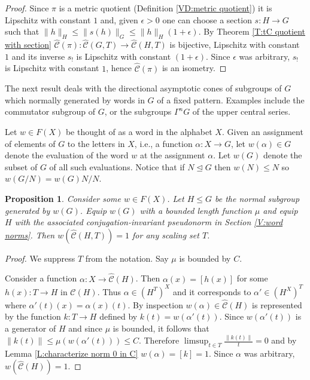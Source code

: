 \documentclass[12pt]{amsart}
\newtheorem{prop}{Proposition}[section]
\theoremstyle{definition}
\def\nsg{\trianglelefteq}
\newcommand{\C}[1]{\mathcal{#1}}
\def\Free{F}
\def\tC{\hat{\mathcal{C}}}
\begin{document}
\begin{proof}
Since $\pi$ is a metric quotient (Definition \ref{VD:metric quotient}) it is Lipschitz with constant $1$ and, given $\epsilon>0$ one can choose a section $s \colon H \to G$ such that $\| h\|_H \leq \|s(h)\|_G \leq \|h\|_H (1+\epsilon)$.
 By Theorem \ref{T:tC quotient with section} $\tC(\pi) \colon \tC(G,T) \to \tC(H,T)$ is bijective, Lipschitz with constant $1$ and its inverse $s_!$ is Lipschitz with constant $(1+\epsilon)$.
Since $\epsilon$ was arbitrary, $s_!$ is Lipschitz with constant $1$, hence $\tC(\pi)$ is an isometry.
\end{proof}




The next result deals with the directional asymptotic cones of subgroups of $G$ which normally generated by words in $G$ of a fixed pattern.
Examples include the commutator subgroup of $G$, or the subgroups $\Gamma^n G$ of the upper central series.


Let $w \in \Free(X)$ be thought of as a word in the alphabet $X$.
Given an assignment of elements of $G$ to the letters in $X$, i.e., a function $\alpha \colon X \to G$, let $w(\alpha) \in G$ denote the evaluation of the word $w$ at the assignment $\alpha$.
Let $w(G)$ denote the subset of $G$ of all such evaluations.
Notice that if $N \nsg G$ then $w(N) \leq N$ so $w(G/N) = w(G)N/N$. 




\begin{prop}\label{P:words preserved by cone}
Consider some $w \in \Free(X)$.
Let $H \leq G$ be the normal subgroup generated by $w(G)$.
Equip $w(G)$ with a {\em bounded} length function $\mu$ and equip $H$ with the associated conjugation-invariant pseudonorm in Section \ref{V:word norms}. 
Then $w(\tC(H,T))=1$ for any scaling set $T$.
\end{prop}

\begin{proof}
We suppress $T$ from the notation.
Say $\mu$ is bounded by $C$.

Consider a function $\alpha \colon X \to \tC(H)$.
Then $\alpha(x)=[h(x)]$ for some $h(x) \colon T \to H$ in $\C C(H)$.
Thus $\alpha \in (H^T)^X$ and it corresponds to $\alpha' \in (H^X)^T$ where $\alpha'(t)(x) = \alpha(x)(t)$.
By inspection $w(\alpha) \in \tC(H)$ is represented by the function $k \colon T \to H$ defined by $k(t)=w(\alpha'(t))$.
Since $w(\alpha'(t))$ is a generator of $H$ and since $\mu$ is bounded, it follows that $\|k(t)\| \leq \mu(w(\alpha'(t))) \leq C$.
Therefore $\limsup_{t \in T} \tfrac{\|k(t)\|}{t}=0$ and by Lemma \ref{L:characterize norm 0 in C} $w(\alpha)=[k]=1$.
Since $\alpha$ was arbitrary, $w(\tC(H))=1$.
\end{proof}
\end{document}
